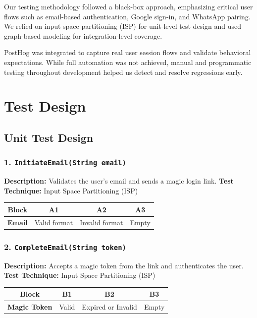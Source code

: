 Our testing methodology followed a black-box approach, emphasizing critical user flows such as email-based authentication, Google sign-in, and WhatsApp pairing. We relied on input space partitioning (ISP) for unit-level test design and used graph-based modeling for integration-level coverage.

PostHog was integrated to capture real user session flows and validate behavioral expectations. While full automation was not achieved, manual and programmatic testing throughout development helped us detect and resolve regressions early.

\section{Test Design}

\subsection*{Unit Test Design}

\subsubsection*{1. \texttt{InitiateEmail(String email)}}

\textbf{Description:} Validates the user’s email and sends a magic login link.  
\textbf{Test Technique:} Input Space Partitioning (ISP)

\begin{table}[h!]
\centering
\begin{tabular}{|c|c|c|c|}
\hline
\textbf{Block} & \textbf{A1} & \textbf{A2} & \textbf{A3} \\
\hline
\textbf{Email} & Valid format & Invalid format & Empty \\
\hline
\end{tabular}
\end{table}

\subsubsection*{2. \texttt{CompleteEmail(String token)}}

\textbf{Description:} Accepts a magic token from the link and authenticates the user.  
\textbf{Test Technique:} Input Space Partitioning (ISP)

\begin{table}[h!]
\centering
\begin{tabular}{|c|c|c|c|}
\hline
\textbf{Block} & \textbf{B1} & \textbf{B2} & \textbf{B3} \\
\hline
\textbf{Magic Token} & Valid & Expired or Invalid & Empty \\
\hline
\end{tabular}
\end{table}

